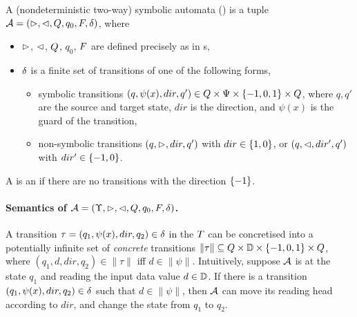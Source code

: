 \begin{definition}\label{def-2sa}
    A (nondeterministic two-way)  symbolic automata (\SSA) is a tuple $\mathcal{A} = (\vartriangleright, \vartriangleleft, Q, q_0, F, \delta)$, where  
\begin{itemize}
%
\item $\vartriangleright$, $\vartriangleleft$, $Q$, $q_0$, $F$ are defined precisely as in \FFA{}s, 
%
\item $\delta$ is a finite set of transitions of one of the following forms,
\begin{itemize}
\item     symbolic transitions $(q, \psi(x), dir, q') \in Q \times \Psi \times \{-1, 0, 1\} \times Q$, where $q, q'$ are the source and target state, $dir$ is the direction, and $\psi(x)$ is the guard of the transition, 
%
\item     non-symbolic transitions $(q, \vartriangleright, dir, q')$ with $dir \in \{1, 0\}$, or $(q, \vartriangleleft, dir', q')$ with $dir' \in \{-1,0\}$. 
\end{itemize}
\end{itemize}
A \SSA{} is an \SA{} if there are no transitions with the direction $\{-1\}$. 
\end{definition}

\paragraph{Semantics of \SSA{} $\mathcal{A} = (\Upsilon, \vartriangleright, \vartriangleleft, Q, q_0, F, \delta)$.}
A transition $\tau=(q_1,\psi(x), dir, q_2) \in \delta$ in the \SSA $T$ can be concretised
into a potentially infinite set of \emph{concrete} transitions $\|\tau\| \subseteq Q \times \mathbb{D} \times \{-1, 0, 1\} \times Q$, where $(q_1, d, dir, q_2)  \in \|\tau\|$ iff $d \in \|\psi\|$.
Intuitively, suppose $\mathcal{A}$ is at the state $q_1$ and reading the input data value $d \in \mathbb{D}$.
If there is a transition $(q_1, \psi(x), dir, q_2) \in \delta$ such that $d \in \|\psi\|$, then $\mathcal{A}$ can move its reading head according to $dir$, and change the state from $q_1$ to $q_2$.

